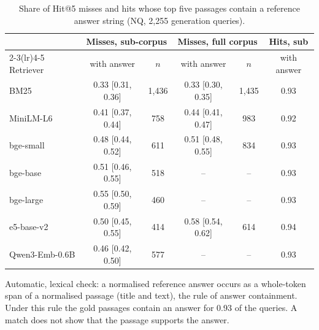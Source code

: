 \begin{table}[t]
\centering
\footnotesize
\caption{Share of Hit@5 misses and hits whose top five passages contain a reference answer string (NQ, 2,255 generation queries).}
\label{tab:answerstr}
\begin{tabular}{lccccc}
\toprule
& \multicolumn{2}{c}{Misses, sub-corpus} & \multicolumn{2}{c}{Misses, full corpus} & Hits, sub \\ \cmidrule(lr){2-3}\cmidrule(lr){4-5} Retriever & with answer & $n$ & with answer & $n$ & with answer \\
\midrule
BM25 & 0.33 [0.31, 0.36] & 1,436 & 0.33 [0.30, 0.35] & 1,435 & 0.93 \\
MiniLM-L6 & 0.41 [0.37, 0.44] & 758 & 0.44 [0.41, 0.47] & 983 & 0.92 \\
bge-small & 0.48 [0.44, 0.52] & 611 & 0.51 [0.48, 0.55] & 834 & 0.93 \\
bge-base & 0.51 [0.46, 0.55] & 518 & -- & -- & 0.93 \\
bge-large & 0.55 [0.50, 0.59] & 460 & -- & -- & 0.93 \\
e5-base-v2 & 0.50 [0.45, 0.55] & 414 & 0.58 [0.54, 0.62] & 614 & 0.94 \\
Qwen3-Emb-0.6B & 0.46 [0.42, 0.50] & 577 & -- & -- & 0.93 \\
\bottomrule
\end{tabular}
\par\smallskip\parbox{\linewidth}{\footnotesize Automatic, lexical check: a normalised reference answer occurs as a whole-token span of a normalised passage (title and text), the rule of answer containment. Under this rule the gold passages contain an answer for 0.93 of the queries. A match does not show that the passage supports the answer.}
\end{table}
